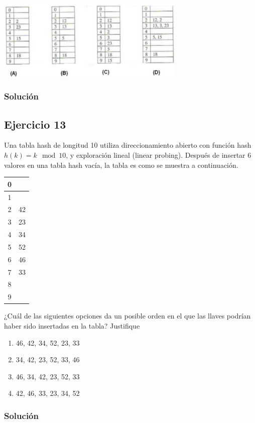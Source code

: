 \documentclass{article}
\begin{document}
\begin{center}
    \includegraphics*[width=340px]{./img/ej12.png}
\end{center}
\subsubsection*{Solución}


\subsection*{Ejercicio 13}
Una tabla hash de longitud 10 utiliza direccionamiento abierto con función hash $h(k)=k \mod 10$, y exploración lineal (linear probing). Después de insertar 6 valores en una tabla hash vacía, la tabla es como se muestra a continuación.

\begin{tabular}{|c|c|}
    \hline
    0 &    \\ \hline
    1 &    \\ \hline
    2 & 42 \\ \hline
    3 & 23 \\ \hline
    4 & 34 \\ \hline
    5 & 52 \\ \hline
    6 & 46 \\ \hline
    7 & 33 \\ \hline
    8 &    \\ \hline
    9 &    \\ \hline
  \end{tabular}

¿Cuál de las siguientes opciones da un posible orden en el que las llaves podrían haber sido
insertadas en la tabla? Justifique
\begin{enumerate}[label=(\Alph*), ref=\Alph*]
    \item 46, 42, 34, 52, 23, 33
    \item 34, 42, 23, 52, 33, 46
    \item 46, 34, 42, 23, 52, 33
    \item 42, 46, 33, 23, 34, 52
\end{enumerate}
\subsubsection*{Solución}
\end{document}
